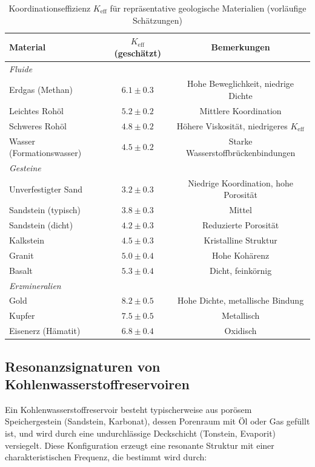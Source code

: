 \documentclass[12pt,a4paper]{article}
\theoremstyle{remark}
\newcommand{\Keff}{K_{\mathrm{eff}}}
\begin{document}
	\begin{table}[htbp]
		\centering
		\caption{Koordinationseffizienz \(\Keff\) für repräsentative geologische Materialien (vorläufige Schätzungen)}
		\label{tab:keff-geology}
		\small
		\begin{tabular}{lcc}
			\toprule
			\textbf{Material} & \textbf{\(\Keff\) (geschätzt)} & \textbf{Bemerkungen} \\
			\midrule
			\multicolumn{3}{l}{\textit{Fluide}} \\
			Erdgas (Methan) & $6.1 \pm 0.3$ & Hohe Beweglichkeit, niedrige Dichte \\
			Leichtes Rohöl & $5.2 \pm 0.2$ & Mittlere Koordination \\
			Schweres Rohöl & $4.8 \pm 0.2$ & Höhere Viskosität, niedrigeres \(\Keff\) \\
			Wasser (Formationswasser) & $4.5 \pm 0.2$ & Starke Wasserstoffbrückenbindungen \\
			\hline
			\multicolumn{3}{l}{\textit{Gesteine}} \\
			Unverfestigter Sand & $3.2 \pm 0.3$ & Niedrige Koordination, hohe Porosität \\
			Sandstein (typisch) & $3.8 \pm 0.3$ & Mittel \\
			Sandstein (dicht) & $4.2 \pm 0.3$ & Reduzierte Porosität \\
			Kalkstein & $4.5 \pm 0.3$ & Kristalline Struktur \\
			Granit & $5.0 \pm 0.4$ & Hohe Kohärenz \\
			Basalt & $5.3 \pm 0.4$ & Dicht, feinkörnig \\
			\hline
			\multicolumn{3}{l}{\textit{Erzmineralien}} \\
			Gold & $8.2 \pm 0.5$ & Hohe Dichte, metallische Bindung \\
			Kupfer & $7.5 \pm 0.5$ & Metallisch \\
			Eisenerz (Hämatit) & $6.8 \pm 0.4$ & Oxidisch \\
			\bottomrule
		\end{tabular}
	\end{table}
	
	\subsection{Resonanzsignaturen von Kohlenwasserstoffreservoiren}
	
	Ein Kohlenwasserstoffreservoir besteht typischerweise aus porösem Speichergestein (Sandstein, Karbonat), dessen Porenraum mit Öl oder Gas gefüllt ist, und wird durch eine undurchlässige Deckschicht (Tonstein, Evaporit) versiegelt. Diese Konfiguration erzeugt eine resonante Struktur mit einer charakteristischen Frequenz, die bestimmt wird durch:
	
\end{document}
